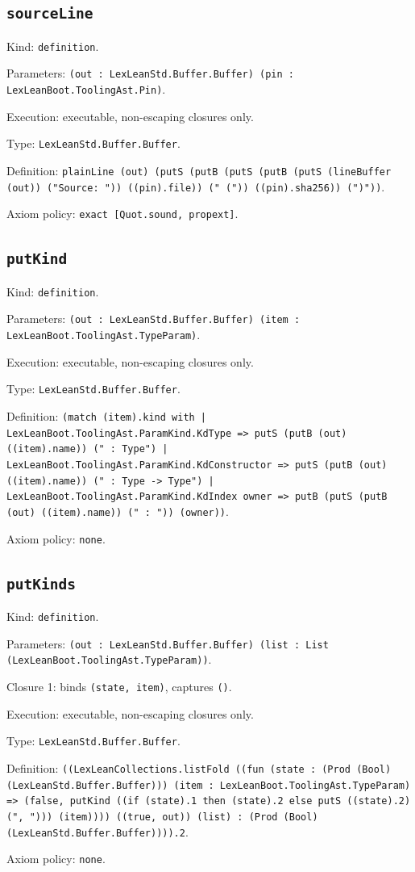 \documentclass[11pt]{article}
\begin{document}
\subsection*{\texttt{sourceLine}}
\noindent Kind: \texttt{definition}.\par
\noindent Parameters: \texttt{(out : LexLeanStd.Buffer.Buffer) (pin : LexLeanBoot.ToolingAst.Pin)}.\par
\noindent Execution: executable, non-escaping closures only.\par
\noindent Type: \texttt{LexLeanStd.Buffer.Buffer}.\par
\noindent Definition: \texttt{plainLine (out) (putS (putB (putS (putB (putS (lineBuffer (out)) ("Source: ")) ((pin).file)) (" (")) ((pin).sha256)) (")"))}.\par
\noindent Axiom policy: \texttt{exact [Quot.sound, propext]}.\par
\subsection*{\texttt{putKind}}
\noindent Kind: \texttt{definition}.\par
\noindent Parameters: \texttt{(out : LexLeanStd.Buffer.Buffer) (item : LexLeanBoot.ToolingAst.TypeParam)}.\par
\noindent Execution: executable, non-escaping closures only.\par
\noindent Type: \texttt{LexLeanStd.Buffer.Buffer}.\par
\noindent Definition: \texttt{(match (item).kind with | LexLeanBoot.ToolingAst.ParamKind.KdType => putS (putB (out) ((item).name)) (" : Type") | LexLeanBoot.ToolingAst.ParamKind.KdConstructor => putS (putB (out) ((item).name)) (" : Type -> Type") | LexLeanBoot.ToolingAst.ParamKind.KdIndex owner => putB (putS (putB (out) ((item).name)) (" : ")) (owner))}.\par
\noindent Axiom policy: \texttt{none}.\par
\subsection*{\texttt{putKinds}}
\noindent Kind: \texttt{definition}.\par
\noindent Parameters: \texttt{(out : LexLeanStd.Buffer.Buffer) (list : List (LexLeanBoot.ToolingAst.TypeParam))}.\par
\noindent Closure 1: binds \texttt{(state, item)}, captures \texttt{()}.\par
\noindent Execution: executable, non-escaping closures only.\par
\noindent Type: \texttt{LexLeanStd.Buffer.Buffer}.\par
\noindent Definition: \texttt{((LexLeanCollections.listFold ((fun (state : (Prod (Bool) (LexLeanStd.Buffer.Buffer))) (item : LexLeanBoot.ToolingAst.TypeParam) => (false, putKind ((if (state).1 then (state).2 else putS ((state).2) (", "))) (item)))) ((true, out)) (list) : (Prod (Bool) (LexLeanStd.Buffer.Buffer)))).2}.\par
\noindent Axiom policy: \texttt{none}.\par
\end{document}
